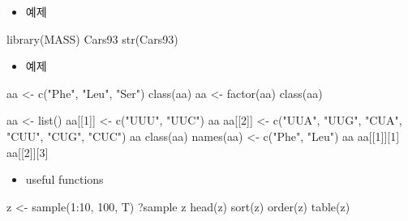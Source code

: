 \documentclass[
]{book}
\newenvironment{Shaded}{\begin{snugshade}}{\end{snugshade}}
\newcommand{\DecValTok}[1]{\textcolor[rgb]{0.00,0.00,0.81}{#1}}
\newcommand{\FunctionTok}[1]{\textcolor[rgb]{0.00,0.00,0.00}{#1}}
\newcommand{\NormalTok}[1]{#1}
\newcommand{\OtherTok}[1]{\textcolor[rgb]{0.56,0.35,0.01}{#1}}
\newcommand{\SpecialCharTok}[1]{\textcolor[rgb]{0.00,0.00,0.00}{#1}}
\newcommand{\StringTok}[1]{\textcolor[rgb]{0.31,0.60,0.02}{#1}}
\providecommand{\tightlist}{%
  \setlength{\itemsep}{0pt}\setlength{\parskip}{0pt}}
\begin{document}
\begin{itemize}
\tightlist
\item
  예제
\end{itemize}

\begin{Shaded}
\begin{Highlighting}[]
\FunctionTok{library}\NormalTok{(MASS)}
\NormalTok{Cars93}
\FunctionTok{str}\NormalTok{(Cars93)}
\end{Highlighting}
\end{Shaded}

\begin{itemize}
\tightlist
\item
  예제
\end{itemize}

\begin{Shaded}
\begin{Highlighting}[]

\NormalTok{aa }\OtherTok{\textless{}{-}} \FunctionTok{c}\NormalTok{(}\StringTok{"Phe"}\NormalTok{, }\StringTok{"Leu"}\NormalTok{, }\StringTok{"Ser"}\NormalTok{)}
\FunctionTok{class}\NormalTok{(aa)}
\NormalTok{aa }\OtherTok{\textless{}{-}} \FunctionTok{factor}\NormalTok{(aa)}
\FunctionTok{class}\NormalTok{(aa)}

\NormalTok{aa }\OtherTok{\textless{}{-}} \FunctionTok{list}\NormalTok{()}
\NormalTok{aa[[}\DecValTok{1}\NormalTok{]] }\OtherTok{\textless{}{-}} \FunctionTok{c}\NormalTok{(}\StringTok{"UUU"}\NormalTok{, }\StringTok{"UUC"}\NormalTok{)}
\NormalTok{aa}
\NormalTok{aa[[}\DecValTok{2}\NormalTok{]] }\OtherTok{\textless{}{-}} \FunctionTok{c}\NormalTok{(}\StringTok{"UUA"}\NormalTok{, }\StringTok{"UUG"}\NormalTok{, }\StringTok{"CUA"}\NormalTok{, }\StringTok{"CUU"}\NormalTok{, }\StringTok{"CUG"}\NormalTok{, }\StringTok{"CUC"}\NormalTok{)}
\NormalTok{aa}
\FunctionTok{class}\NormalTok{(aa)}
\FunctionTok{names}\NormalTok{(aa) }\OtherTok{\textless{}{-}} \FunctionTok{c}\NormalTok{(}\StringTok{"Phe"}\NormalTok{, }\StringTok{"Leu"}\NormalTok{)}
\NormalTok{aa}
\NormalTok{aa[[}\DecValTok{1}\NormalTok{]][}\DecValTok{1}\NormalTok{]}
\NormalTok{aa[[}\DecValTok{2}\NormalTok{]][}\DecValTok{3}\NormalTok{]}
\end{Highlighting}
\end{Shaded}

\begin{itemize}
\tightlist
\item
  useful functions
\end{itemize}

\begin{Shaded}
\begin{Highlighting}[]
\NormalTok{z }\OtherTok{\textless{}{-}} \FunctionTok{sample}\NormalTok{(}\DecValTok{1}\SpecialCharTok{:}\DecValTok{10}\NormalTok{, }\DecValTok{100}\NormalTok{, T)}
\NormalTok{?sample}
\NormalTok{z}
\FunctionTok{head}\NormalTok{(z)}
\FunctionTok{sort}\NormalTok{(z)}
\FunctionTok{order}\NormalTok{(z)}
\FunctionTok{table}\NormalTok{(z)}
\end{Highlighting}
\end{Shaded}
\end{document}
